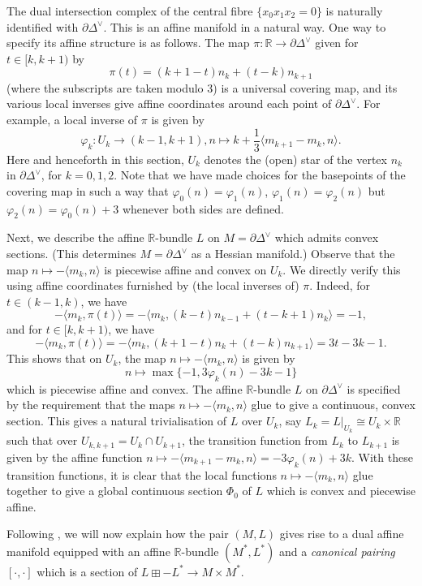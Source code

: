 \documentclass{article}
\newcommand{\RR}{\mathbb{R}}
\begin{document}
The dual intersection complex of the central fibre $\{x_0x_1x_2=0\}$ is naturally identified with $\partial \Delta^\vee$. This is an affine manifold in a natural way. One way to specify its affine structure is as follows. The map $\pi:\RR \to \partial \Delta^\vee$ given for $t\in[k,k+1)$ by 
\[
\pi(t) = (k+1-t)n_k + (t-k)n_{k+1}
\]
(where the subscripts are taken modulo 3) is a universal covering map, and its various local inverses give affine coordinates around each point of $\partial \Delta^\vee$. For example, a local inverse of $\pi$ is given by 
\[
\varphi_k: U_k \to (k-1,k+1), n\mapsto k + \frac{1}{3}\langle m_{k+1}-m_k,n\rangle.
\]
Here and henceforth in this section, $U_k$ denotes the (open) star of the vertex $n_k$ in $\partial \Delta^\vee$, for $k=0,1,2$. Note that we have made choices for the basepoints of the covering map in such a way that $\varphi_0(n) = \varphi_1(n)$, $\varphi_1(n) = \varphi_2(n)$ but $\varphi_2(n) = \varphi_0(n) + 3$ whenever both sides are defined.

Next, we describe the affine $\RR$-bundle $L$ on $M=\partial\Delta^\vee$ which admits convex sections. (This determines $M= \partial\Delta^\vee$ as a Hessian manifold.) Observe that the map $n\mapsto -\langle m_k,n\rangle$ is piecewise affine and convex on $U_k$. We directly verify this using affine coordinates furnished by (the local inverses of) $\pi$. Indeed, for $t\in (k-1,k)$, we have 
\[
-\langle m_k, \pi(t)\rangle = -\langle m_k, (k-t)n_{k-1}+(t-k+1)n_k\rangle = -1,
\]
and for $t\in [k,k+1)$, we have 
\[
-\langle m_k, \pi(t)\rangle = -\langle m_k, (k+1-t)n_{k}+(t-k)n_{k+1}\rangle = 3t-3k-1.
\]
This shows that on $U_k$, the map $n\mapsto -\langle m_k, n\rangle $ is given by 
\[n\mapsto \max\{-1,3\varphi_k(n)-3k-1\}\]
which is piecewise affine and convex. The affine $\RR$-bundle $L$ on $\partial \Delta^\vee$ is specified by the requirement that the maps $n\mapsto -\langle m_k,n\rangle$ glue to give a continuous, convex section. This gives a natural trivialisation of $L$ over $U_k$, say $L_k = L\vert_{U_k} \cong U_k \times \RR$ such that over $U_{k,k+1} = U_k\cap U_{k+1}$, the transition function from $L_k$ to $L_{k+1}$ is given by the affine function $n\mapsto -\langle m_{k+1} - m_{k}, n\rangle= -3\varphi_k(n) +3k$. With these transition functions, it is clear that the local functions $n\mapsto -\langle m_k, n \rangle$ glue together to give a global continuous section $\Phi_0$ of $L$ which is convex and piecewise affine.

Following \cite{HO}, we will now explain how the pair $(M,L)$ gives rise to a dual affine manifold equipped with an affine $\mathbb R$-bundle $(M^*,L^*)$ and a \emph{canonical pairing} $[\cdot,\cdot]$ which is a section of $L\boxplus -L^*\rightarrow M\times M^*$. 
\end{document}
